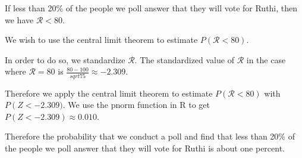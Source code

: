 \documentclass[a4paper,11pt]{article}
\begin{document}
If less than 20\% of the people we poll answer that they will vote
for Ruthi, then we have $\mathcal{R} < 80$.

We wish to use the central limit theorem to estimate
$P\left(\mathcal R < 80 \right)$.

In order to do so, we standardize $\mathcal{R}$.  The standardized
value of $\mathcal{R}$ in the case where $\mathcal{R} = 80$ is
$\frac{80-100}{sqrt{75}} \approx -2.309$.

Therefore we apply the central limit theorem to estimate
$P \left( \mathcal{R} < 80 \right)$ with
$P \left( Z < -2.309)$. We use the pnorm function in
R to get $P \left( Z < -2.309 \right) \approx 0.010$.

Therefore the probability that we conduct a poll and find that
less than 20\% of the people we poll answer that they
will vote for Ruthi is about one percent.

\printbibliography{}
\end{document}

